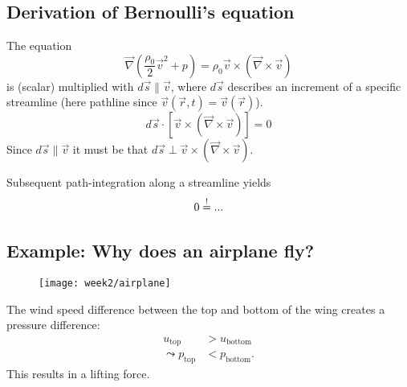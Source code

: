 \subsection{Derivation of Bernoulli's equation}
The equation
\begin{equation}
\vec{\nabla}\left(\frac{\rho_0}{2}\vec{v}^2+p\right) = \rho_0\vec{v}\times\left(\vec{\nabla}\times\vec{v}\right)
\end{equation}
is (scalar) multiplied with $d\vec{s}\parallel\vec{v}$, where $d\vec{s}$ describes an increment of a specific streamline (here pathline since $\vec{v}(\vec{r},t) = \vec{v}(\vec{r})$).
\begin{equation}
d\vec{s}\cdot\left[\vec{v}\times\left(\vec{\nabla}\times\vec{v}\right)\right]=0
\end{equation}
Since $d\vec{s}\parallel\vec{v}$ it must be that $d\vec{s}\perp\vec{v}\times\left(\vec{\nabla}\times\vec{v}\right)$.

Subsequent path-integration along a streamline yields
\begin{align}
0 \overset{!}{=} ...
\end{align}


\subsection{Example: Why does an airplane fly?}
\begin{figure}[!h]
    \centering
    \texttt{[image: week2/airplane]}
    \caption{}
    \label{fig:airplane}
\end{figure}
The wind speed difference between the top and bottom of the wing creates a pressure difference:
\begin{align}
u_\mathrm{top} &> u_\mathrm{bottom}\\
\leadsto
p_\mathrm{top} &< p_\mathrm{bottom}.
\end{align}
This results in a lifting force.